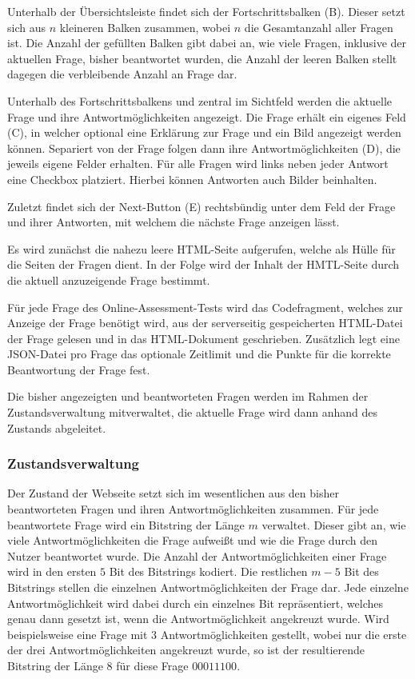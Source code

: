 Unterhalb der Übersichtsleiste findet sich der Fortschrittsbalken (B). 
Dieser setzt sich aus $n$ kleineren Balken zusammen, wobei $n$ die Gesamtanzahl aller Fragen ist.
Die Anzahl der gefüllten Balken gibt dabei an, wie viele Fragen, inklusive der aktuellen Frage, bisher beantwortet wurden, die Anzahl der leeren Balken stellt dagegen die verbleibende Anzahl an Frage dar. 

Unterhalb des Fortschrittsbalkens und zentral im Sichtfeld werden die aktuelle Frage und ihre Antwortmöglichkeiten angezeigt. 
Die Frage erhält ein eigenes Feld (C), in welcher optional eine Erklärung zur Frage und ein Bild angezeigt werden können.
Separiert von der Frage folgen dann ihre Antwortmöglichkeiten (D), die jeweils eigene Felder erhalten. 
Für alle Fragen wird links neben jeder Antwort eine Checkbox platziert.
Hierbei können Antworten auch Bilder beinhalten.

Zuletzt findet sich der Next-Button (E) rechtsbündig unter dem Feld der Frage und ihrer Antworten, mit welchem die nächste Frage anzeigen lässt.

Es wird zunächst die nahezu leere HTML-Seite aufgerufen, welche als Hülle für die Seiten der Fragen dient. 
In der Folge wird der Inhalt der HMTL-Seite durch die aktuell anzuzeigende Frage bestimmt.

Für jede Frage des Online-Assessment-Tests wird das Codefragment, welches zur Anzeige der Frage benötigt wird, aus der serverseitig gespeicherten HTML-Datei der Frage gelesen und in das HTML-Dokument geschrieben. 
Zusätzlich legt eine JSON-Datei pro Frage das optionale Zeitlimit und die Punkte für die korrekte Beantwortung der Frage fest.

Die bisher angezeigten und beantworteten Fragen werden im Rahmen der Zustandsverwaltung mitverwaltet, die aktuelle Frage wird dann anhand des Zustands abgeleitet.

\subsubsection{Zustandsverwaltung}

Der Zustand der Webseite setzt sich im wesentlichen aus den bisher beantworteten Fragen und ihren Antwortmöglichkeiten zusammen. 
Für jede beantwortete Frage wird ein Bitstring der Länge $m$ verwaltet. Dieser gibt an, wie viele Antwortmöglichkeiten die Frage aufweißt und wie die Frage durch den Nutzer beantwortet wurde. 
Die Anzahl der Antwortmöglichkeiten einer Frage wird in den ersten $5$ Bit des Bitstrings kodiert. 
Die restlichen $m - 5$ Bit des Bitstrings stellen die einzelnen Antwortmöglichkeiten der Frage dar. Jede einzelne Antwortmöglichkeit wird dabei durch ein einzelnes Bit repräsentiert, welches genau dann gesetzt ist, wenn die Antwortmöglichkeit angekreuzt wurde.
Wird beispielsweise eine Frage mit $3$ Antwortmöglichkeiten gestellt, wobei nur die erste der drei Antwortmöglichkeiten angekreuzt wurde, so ist der resultierende Bitstring der Länge $8$ für diese Frage $00011100$.


